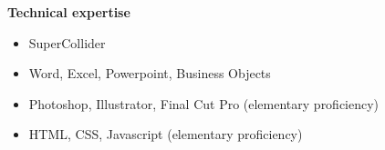 \documentclass[10pt,a4paper]{article}
\begin{document}
\headedsection  %
  {\textbf{Technical expertise}} 
  {
	\begin{itemize} \itemsep -0pt %
	\item SuperCollider
	\item Word, Excel, Powerpoint, Business Objects
	\item Photoshop, Illustrator, Final Cut Pro (elementary proficiency)
	\item HTML, CSS, Javascript (elementary proficiency)
	\end{itemize}
   }









\newpage
\end{document}
